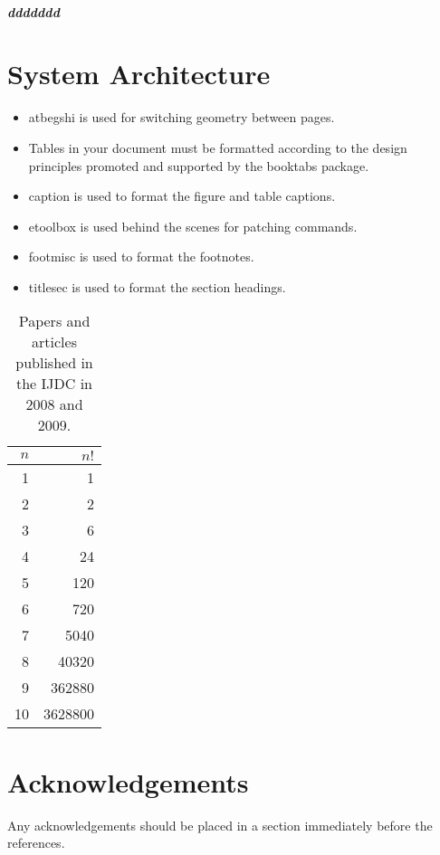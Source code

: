 \documentclass[paper]{ijdc-v9}
\begin{document}
\subparagraph{ddddddd}

\section{System Architecture}

\begin{itemize}
\item\textsf{atbegshi} is used for switching geometry between pages.
\item Tables in your document must be formatted according to the design principles promoted and supported by the \textsf{booktabs} package.
\item\textsf{caption} is used to format the figure and table captions.
\item\textsf{etoolbox} is used behind the scenes for patching commands.
\item\textsf{footmisc} is used to format the footnotes.
\item\textsf{titlesec} is used to format the section headings.
\end{itemize}



\begin{table}
\caption{Papers and articles published in the IJDC in 2008 and 2009.} 
\label{tab:issues} 
\centering\small 
\begin{tabular}{|r|r|}
\hline
$n$&$n!$\\
\hline
1&1\\
2&2\\
3&6\\
4&24\\
5&120\\
6&720\\
7&5040\\
8&40320\\
9&362880\\
10&3628800\\
\hline
\end{tabular}\end{table}

\section{Acknowledgements}

Any acknowledgements should be placed in a section immediately before the references.\nocite{*}


\end{document}
